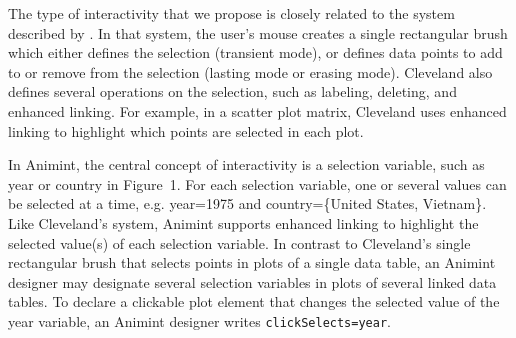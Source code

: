 \documentclass[10pt,journal,compsoc]{IEEEtran}\usepackage[]{graphicx}\usepackage[]{color}
\begin{document}



The type of interactivity that we propose is closely related to the
system described by \citet{cleveland}. In that system, the user's
mouse creates a single rectangular brush which either defines the
selection (transient mode), or defines data points to add to or remove
from the selection (lasting mode or erasing mode). Cleveland also
defines several operations on the selection, such as labeling,
deleting, and enhanced linking. For example, in a scatter plot matrix,
Cleveland uses enhanced linking to highlight which points are selected
in each plot.

In Animint, the central concept of interactivity is a selection
variable, such as year or country in Figure~1. For each selection
variable, one or several values can be selected at a time,
e.g. year=1975 and country=\{United States, Vietnam\}.
Like Cleveland's system, Animint supports enhanced
linking to highlight the selected value(s) of each selection variable. In
contrast to Cleveland's single rectangular brush that selects points in
plots of a single data table, an Animint designer may designate
several selection variables in plots of several linked data tables. To
declare a clickable plot element that changes the selected value of
the year variable, an Animint designer writes
\texttt{clickSelects=year}.
\end{document}
